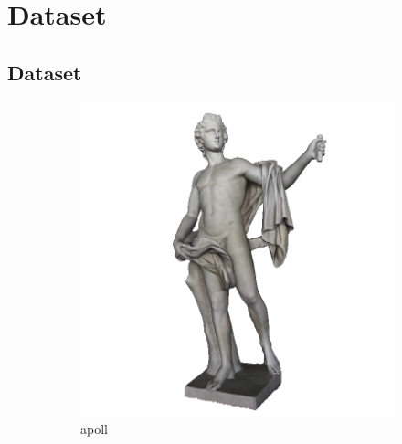 
\chapter{Dataset} %

\label{AppendixA} %


\section{Dataset}
\begin{figure}
	\centering
	\begin{subfigure}[b]{0.23\linewidth}
		\includegraphics[width=\linewidth]{./Figures/train-dataset/00.apoll.png}
		\caption{apoll}
	\end{subfigure}
	\begin{subfigure}[b]{0.23\linewidth}

\end{subfigure}
\end{figure}
